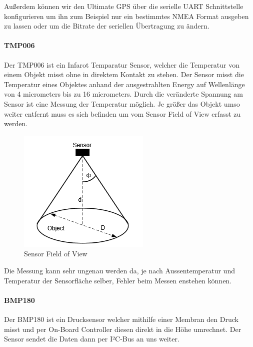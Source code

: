 Außerdem können wir den Ultimate GPS über die serielle UART Schnittstelle konfigurieren um ihn zum Beispiel nur ein bestimmtes NMEA Format ausgeben zu lassen oder um die Bitrate der seriellen Übertragung zu ändern.

\paragraph{TMP006}
Der TMP006 ist ein Infarot Temparatur Sensor, welcher die Temperatur von einem Objekt misst ohne in direktem Kontakt zu stehen. Der Sensor misst die Temperatur eines Objektes anhand der ausgestrahlten Energy auf Wellenlänge von 4 micrometers bis zu 16 micrometers. Durch die veränderte Spannung am Sensor ist eine Messung der Temperatur möglich. Je größer das Objekt umso weiter entfernt muss es sich befinden um vom Sensor Field of View erfasst zu werden.

\begin{figure}[h]
	\centering
	\includegraphics[scale=0.5]{2_Beschreibung_des_CANSAT/sensor_fov.png}
	\caption{Sensor Field of View}
	\label{sensor fov}
\end{figure}

Die Messung kann sehr ungenau werden da, je nach Aussentemperatur und Temperatur der Sensorfläche selber, Fehler beim Messen enstehen können.

\paragraph{BMP180}
Der BMP180 ist ein Drucksensor welcher mithilfe einer Membran den Druck misst und per On-Board Controller diesen direkt in die Höhe umrechnet. Der Sensor sendet die Daten dann per I²C-Bus an uns weiter.

